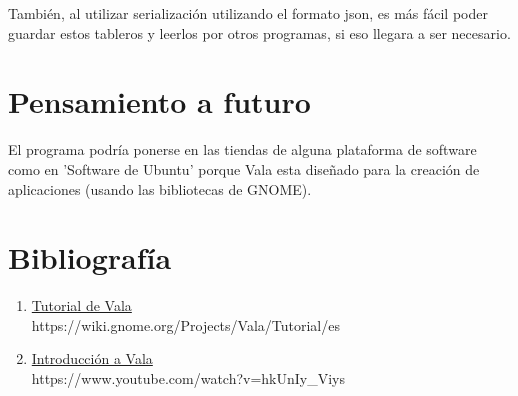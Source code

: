 \documentclass{article}
\begin{document}
	También, al utilizar serialización utilizando el formato json, es más fácil
	poder guardar estos tableros y leerlos por otros programas, si eso llegara
	a ser necesario.

    \section{Pensamiento a futuro}

    El programa podría ponerse en las tiendas de alguna plataforma de software como en 'Software de Ubuntu' porque Vala esta diseñado para la creación de aplicaciones (usando las bibliotecas de GNOME).

    \section*{Bibliografía}
    \newcommand*{\biblio}[2]{\item \href{#2}{#1}\\\textsf{#2}}
    \begin{enumerate}
        \biblio{Tutorial de Vala}{https://wiki.gnome.org/Projects/Vala/Tutorial/es}
        \biblio{Introducción a Vala}{https://www.youtube.com/watch?v=hkUnIy\_Viys}
    \end{enumerate}
\end{document}
